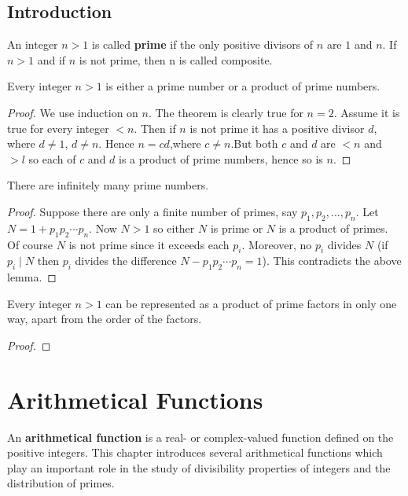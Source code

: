 \section*{Introduction}
An integer $n>1$ is called \textbf{prime} if the only positive divisors of $n$ are $1$ and $n$. If $n>1$ and if $n$ is not prime, then n is called composite.

\begin{lemma*}
Every integer $n>1$ is either a prime number or a product of prime numbers.
\end{lemma*}

\begin{proof}
We use induction on $n$. The theorem is clearly true for $n=2$. Assume it is true for every integer $<n$. Then if $n$ is not prime it has a positive divisor $d$, where $d\neq1$, $d\neq n$. Hence $n=cd$,where $c\neq n$.But both $c$ and $d$ are $<n$ and $>l$ so each of $c$ and $d$ is a product of prime numbers, hence so is $n$.
\end{proof}

\begin{theorem}[Euclid]
There are infinitely many prime numbers.
\end{theorem}

\begin{proof}
Suppose there are only a finite number of primes, say $p_1,p_2,\dots,p_n$. Let $N=1+p_1p_2\cdots p_n$. Now $N>1$ so either $N$ is prime or $N$ is a product of primes. Of course $N$ is not prime since it exceeds each $p_i$. Moreover, no $p_i$ divides $N$ (if $p_i\mid N$ then $p_i$ divides the difference $N-p_1p_2\cdots p_n=1$). This contradicts the above lemma.
\end{proof}

\begin{theorem}
Every integer $n>1$ can be represented as a product of prime factors in only one way, apart from the order of the factors.
\end{theorem}

\begin{proof}

\end{proof}



\chapter{Arithmetical Functions}
An \textbf{arithmetical function} is a real- or complex-valued function defined on the positive integers. This chapter introduces several arithmetical functions which play an important role in the study of divisibility properties of integers and the distribution of primes.

